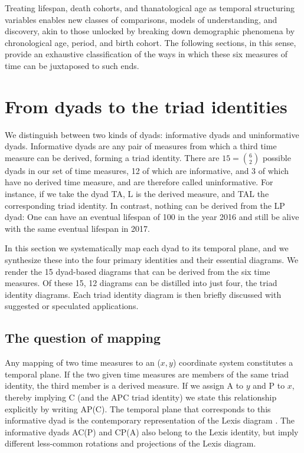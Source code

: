 \documentclass[12pt,oneside,a4paper,doublespacing]{article} %
\theoremstyle{definition}
\begin{document}
Treating lifespan,
death cohorts, and thanatological age as temporal structuring variables
enables new classes of comparisons, models of understanding, and discovery,
akin to those unlocked by breaking down demographic phenomena by chronological age,
period, and birth cohort. The following sections, in this sense, provide an
exhaustive classification of the ways in which these six measures of time can be juxtaposed to such ends.


\section{From dyads to the triad identities}
\label{sec:dyads2diagrams}
We distinguish between two kinds of dyads: informative dyads and uninformative dyads. Informative dyads are any pair of measures from which a third time measure
can be derived, forming a triad identity. There are
$15=\binom{6}{2}$ possible dyads in our set of time measures, 12 of which are
informative, and 3 of which have no derived time measure, and are therefore
called uninformative. For instance, if we take the dyad TA, L is the derived
measure, and TAL the corresponding triad identity. In
contrast, nothing can be derived from the LP dyad: One can have an eventual
lifespan of 100 in the year 2016 and still be alive with the same eventual lifespan in 2017.

In this section we systematically map each dyad to its temporal plane, and we
synthesize these into the four primary identities and their essential diagrams.
We render the 15 dyad-based diagrams that can be derived from the six time
measures. Of these 15, 12 diagrams can be distilled into just four, the triad identity diagrams. Each triad identity diagram is then briefly discussed with suggested or speculated
applications.

\subsection{The question of mapping}
Any mapping of two time measures to an ($x,y$) coordinate
system constitutes a temporal plane. If the two given time measures are members of the same triad identity, the third member is a derived
measure. If we assign A to $y$ and P to $x$, thereby implying C (and the APC
triad identity) we state this relationship explicitly by writing
AP(C).
The temporal plane that corresponds to this informative dyad is the contemporary representation of the
Lexis diagram \citep{lexis1875einleitung, pressat1961analyse}. The informative
dyads AC(P) and CP(A) also belong to the Lexis identity, but imply different
less-common rotations and projections of the Lexis diagram.
\end{document}
